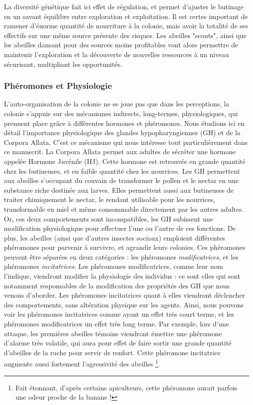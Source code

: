 			La diversité génétique fait ici effet de régulation, et permet d'ajuster le butinage en un savant équilibre entre exploration et exploitation. Il est certes important de ramener d'énorme quantité de nourriture à la colonie, mais avoir la totalité de ses effectifs sur une même source présente des risques. Les abeilles "scouts", ainsi que les abeilles dansant pour des sources moins profitables vont alors permettre de maintenir l'exploration et la découverte de nouvelles ressources à un niveau sécurisant, multipliant les opportunités.
			
		\subsubsection{Phéromones et Physiologie}
			\label{subsubPhysio}
			L'auto-organisation de la colonie ne se joue pas que dans les perceptions, la colonie s'appuie sur des mécanismes indirects, long-termes, physiologiques, qui prennent place grâce à différentes hormones et phéromones.  Nous étudions ici en détail l'importance physiologique des glandes hypopharyngiennes (GH) et de la Corpora Allata. C'est ce mécanisme qui nous intéresse tout particulièrement dans ce manuscrit. La Corpora Allata permet aux adultes de sécréter une hormone appelée Hormone Juvénile (HJ). Cette hormone est retrouvée en grande quantité chez les butineuses, et en faible quantité chez les nourrices. Les GH permettent aux abeilles s'occupant du couvain de transformer le pollen et le nectar en une substance riche destinée aux larves. Elles permettent aussi aux butineuses de traiter chimiquement le nectar, le rendant utilisable pour les nourrices, transformable en miel et même consommable directement par les autres adultes. Or, ces deux comportements sont incompatibles, les GH subissent une modification physiologique pour effectuer l'une ou l'autre de ces fonctions. De plus, les abeilles (ainsi que d'autres insectes sociaux) emploient différentes phéromones pour parvenir à survivre, et agrandir leurs colonies. Ces phéromones peuvent être séparées en deux catégories : les phéromones \textit{modificatrices}, et les phéromones \textit{incitatrices}. Les phéromones modificatrices, comme leur nom l'indique, viendront modifier la physiologie des individus : ce sont elles qui sont notamment responsables de la modification des propriétés des GH que nous venons d'aborder. Les phéromones incitatrices quant à elles viendront déclencher des comportements, sans altération physique sur les agents. Ainsi, nous pouvons voir les phéromones incitatrices comme ayant un effet très court terme, et les phéromones modificatrices un effet très long terme. Par exemple, lors d'une attaque, les premières abeilles témoins viendront émettre une phéromone d'alarme très volatile, qui aura pour effet de faire sortir une grande quantité d'abeilles de la ruche pour servir de renfort. Cette phéromone incitatrice augmente aussi fortement l'agressivité des abeilles \footnote{Fait étonnant, d'après certains apiculteurs, cette phéromone aurait parfois une odeur proche de la banane !}.
			
